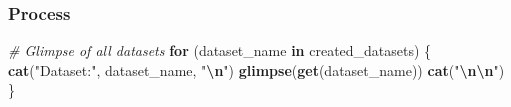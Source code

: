 \documentclass[
]{article}
\newenvironment{Shaded}{\begin{snugshade}}{\end{snugshade}}
\newcommand{\CommentTok}[1]{\textcolor[rgb]{0.56,0.35,0.01}{\textit{#1}}}
\newcommand{\ControlFlowTok}[1]{\textcolor[rgb]{0.13,0.29,0.53}{\textbf{#1}}}
\newcommand{\FunctionTok}[1]{\textcolor[rgb]{0.13,0.29,0.53}{\textbf{#1}}}
\newcommand{\NormalTok}[1]{#1}
\newcommand{\SpecialCharTok}[1]{\textcolor[rgb]{0.81,0.36,0.00}{\textbf{#1}}}
\newcommand{\StringTok}[1]{\textcolor[rgb]{0.31,0.60,0.02}{#1}}
\begin{document}
\subsubsection{Process}\label{process}

\begin{Shaded}
\begin{Highlighting}[]
\CommentTok{\# Glimpse of all datasets}
\ControlFlowTok{for}\NormalTok{ (dataset\_name }\ControlFlowTok{in}\NormalTok{ created\_datasets) \{}
  \FunctionTok{cat}\NormalTok{(}\StringTok{"Dataset:"}\NormalTok{, dataset\_name, }\StringTok{"}\SpecialCharTok{\textbackslash{}n}\StringTok{"}\NormalTok{)}
  \FunctionTok{glimpse}\NormalTok{(}\FunctionTok{get}\NormalTok{(dataset\_name))}
  \FunctionTok{cat}\NormalTok{(}\StringTok{"}\SpecialCharTok{\textbackslash{}n\textbackslash{}n}\StringTok{"}\NormalTok{)}
\NormalTok{\}}
\end{Highlighting}
\end{Shaded}
\end{document}
